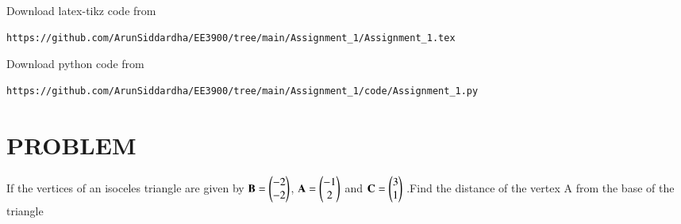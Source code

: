 \documentclass[journal,12pt,twocolumn]{IEEEtran}
\begin{document}
%
Download latex-tikz code from 
%
\begin{lstlisting}
https://github.com/ArunSiddardha/EE3900/tree/main/Assignment_1/Assignment_1.tex
\end{lstlisting}
%
Download python code from 
%
\begin{lstlisting}
https://github.com/ArunSiddardha/EE3900/tree/main/Assignment_1/code/Assignment_1.py
\end{lstlisting}
\section{PROBLEM}
If the vertices of an isoceles triangle are given by  $\mathbf{B} = \begin{pmatrix}-2\\-2\end{pmatrix}$, $\mathbf{A}=\begin{pmatrix}-1\\2\end{pmatrix}$ and $\mathbf{C}=\begin{pmatrix}3\\1\end{pmatrix}$ .Find the distance of the vertex A from the base of the triangle 
\end{document}
